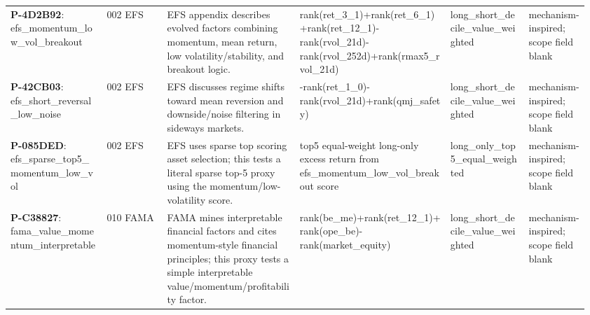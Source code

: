 \begin{longtable}{@{}L{0.16\linewidth}L{0.10\linewidth}L{0.22\linewidth}L{0.25\linewidth}L{0.13\linewidth}L{0.10\linewidth}@{}}
\textbf{P-4D2B92}: efs\_\allowbreak{}momentum\_\allowbreak{}low\_\allowbreak{}vol\_\allowbreak{}breakout & 002 EFS & EFS appendix describes evolved factors combining momentum, mean return, low volatility/stability, and breakout logic. & rank(\allowbreak{}ret\_\allowbreak{}3\_\allowbreak{}1)\allowbreak{}+\allowbreak{}rank(\allowbreak{}ret\_\allowbreak{}6\_\allowbreak{}1)\allowbreak{}+\allowbreak{}rank(\allowbreak{}ret\_\allowbreak{}12\_\allowbreak{}1)\allowbreak{}-\allowbreak{}rank(\allowbreak{}rvol\_\allowbreak{}21d)\allowbreak{}-\allowbreak{}rank(\allowbreak{}rvol\_\allowbreak{}252d)\allowbreak{}+\allowbreak{}rank(\allowbreak{}rmax5\_\allowbreak{}rvol\_\allowbreak{}21d)\allowbreak{} & long\_\allowbreak{}short\_\allowbreak{}decile\_\allowbreak{}value\_\allowbreak{}weighted & mechanism-\allowbreak{}inspired;\allowbreak{} scope field blank \\
\textbf{P-42CB03}: efs\_\allowbreak{}short\_\allowbreak{}reversal\_\allowbreak{}low\_\allowbreak{}noise & 002 EFS & EFS discusses regime shifts toward mean reversion and downside/noise filtering in sideways markets. & -\allowbreak{}rank(\allowbreak{}ret\_\allowbreak{}1\_\allowbreak{}0)\allowbreak{}-\allowbreak{}rank(\allowbreak{}rvol\_\allowbreak{}21d)\allowbreak{}+\allowbreak{}rank(\allowbreak{}qmj\_\allowbreak{}safety)\allowbreak{} & long\_\allowbreak{}short\_\allowbreak{}decile\_\allowbreak{}value\_\allowbreak{}weighted & mechanism-\allowbreak{}inspired;\allowbreak{} scope field blank \\
\textbf{P-085DED}: efs\_\allowbreak{}sparse\_\allowbreak{}top5\_\allowbreak{}momentum\_\allowbreak{}low\_\allowbreak{}vol & 002 EFS & EFS uses sparse top scoring asset selection; this tests a literal sparse top-5 proxy using the momentum/low-volatility score. & top5 equal-\allowbreak{}weight long-\allowbreak{}only excess return from efs\_\allowbreak{}momentum\_\allowbreak{}low\_\allowbreak{}vol\_\allowbreak{}breakout score & long\_\allowbreak{}only\_\allowbreak{}top5\_\allowbreak{}equal\_\allowbreak{}weighted & mechanism-\allowbreak{}inspired;\allowbreak{} scope field blank \\
\textbf{P-C38827}: fama\_\allowbreak{}value\_\allowbreak{}momentum\_\allowbreak{}interpretabl\allowbreak{}e & 010 FAMA & FAMA mines interpretable financial factors and cites momentum-style financial principles; this proxy tests a simple interpretable value/momentum/profitability factor. & rank(\allowbreak{}be\_\allowbreak{}me)\allowbreak{}+\allowbreak{}rank(\allowbreak{}ret\_\allowbreak{}12\_\allowbreak{}1)\allowbreak{}+\allowbreak{}rank(\allowbreak{}ope\_\allowbreak{}be)\allowbreak{}-\allowbreak{}rank(\allowbreak{}market\_\allowbreak{}equity)\allowbreak{} & long\_\allowbreak{}short\_\allowbreak{}decile\_\allowbreak{}value\_\allowbreak{}weighted & mechanism-\allowbreak{}inspired;\allowbreak{} scope field blank \\

\end{longtable}
